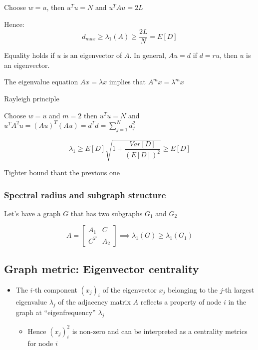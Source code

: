 Choose $w = u$, then $u^Tu = N$ and $u^TAu = 2L$

Hence:
$$
d_{max} \ge \lambda_1 (A) \ge \frac{2L}{N} = E[D]
$$

Equality holds if $u$ is an eigenvector of $A$. In general, $A u = d$ if $d = r u$, then 
$u$ is an eigenvector. 

The eigenvalue equation $A x = \lambda x$ implies that $A^m x = \lambda^m x$

Rayleigh principle

Choose $w = u$ and $m = 2$ then $u^Tu = N$ and 
$u^T A^2 u= (Au)^T (Au) = d^Td = \sum_{j = 1}^N d^2_j$

$$
\lambda_1 \ge E[D]\sqrt{1 + \frac{Var[D]}{(E[D])^2}} \ge E[D]
$$

Tighter bound thant the previous one

\subsubsection{Spectral radius and subgraph structure}
Let's have a graph $G$ that has two subgraphs $G_1$ and $G_2$

$$
A = 
\begin{bmatrix}
  A_1 & C \\
  C^T & A_2
\end{bmatrix}
\implies \lambda_1(G) \ge \lambda_1(G_1)
$$

\subsection{Graph metric: Eigenvector centrality}

\begin{itemize}
  \item The $i$-th component $(x_j)_i$ of the eigenvector $x_j$ belonging to the $j$-th 
  largest eigenvalue $\lambda_j$ of the adjacency matrix $A$ reflects a property of node 
  $i$ in the graph at ``eigenfrequency'' $\lambda_j$
  \begin{itemize}
    \item Hence $(x_j)_i^2$ is non-zero and can be interpreted as a centrality metrics for node $i$
  \end{itemize}
\end{itemize}



